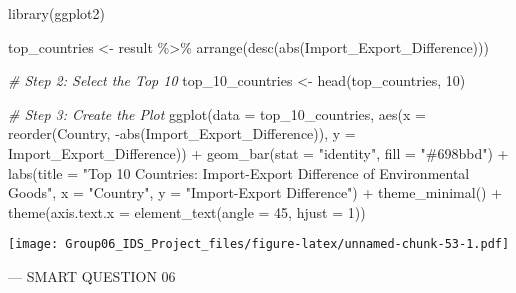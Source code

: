 \documentclass[
]{article}
\newenvironment{Shaded}{\begin{snugshade}}{\end{snugshade}}
\newcommand{\AttributeTok}[1]{\textcolor[rgb]{0.77,0.63,0.00}{#1}}
\newcommand{\CommentTok}[1]{\textcolor[rgb]{0.56,0.35,0.01}{\textit{#1}}}
\newcommand{\DecValTok}[1]{\textcolor[rgb]{0.00,0.00,0.81}{#1}}
\newcommand{\FunctionTok}[1]{\textcolor[rgb]{0.00,0.00,0.00}{#1}}
\newcommand{\NormalTok}[1]{#1}
\newcommand{\OtherTok}[1]{\textcolor[rgb]{0.56,0.35,0.01}{#1}}
\newcommand{\SpecialCharTok}[1]{\textcolor[rgb]{0.00,0.00,0.00}{#1}}
\newcommand{\StringTok}[1]{\textcolor[rgb]{0.31,0.60,0.02}{#1}}
\begin{document}
\begin{Shaded}
\begin{Highlighting}[]
\FunctionTok{library}\NormalTok{(ggplot2)}

\NormalTok{top\_countries }\OtherTok{\textless{}{-}}\NormalTok{ result }\SpecialCharTok{\%\textgreater{}\%}
  \FunctionTok{arrange}\NormalTok{(}\FunctionTok{desc}\NormalTok{(}\FunctionTok{abs}\NormalTok{(Import\_Export\_Difference)))}

\CommentTok{\# Step 2: Select the Top 10}
\NormalTok{top\_10\_countries }\OtherTok{\textless{}{-}} \FunctionTok{head}\NormalTok{(top\_countries, }\DecValTok{10}\NormalTok{)}

\CommentTok{\# Step 3: Create the Plot}
\FunctionTok{ggplot}\NormalTok{(}\AttributeTok{data =}\NormalTok{ top\_10\_countries, }\FunctionTok{aes}\NormalTok{(}\AttributeTok{x =} \FunctionTok{reorder}\NormalTok{(Country, }\SpecialCharTok{{-}}\FunctionTok{abs}\NormalTok{(Import\_Export\_Difference)), }\AttributeTok{y =}\NormalTok{ Import\_Export\_Difference)) }\SpecialCharTok{+}
  \FunctionTok{geom\_bar}\NormalTok{(}\AttributeTok{stat =} \StringTok{"identity"}\NormalTok{, }\AttributeTok{fill =} \StringTok{"\#698bbd"}\NormalTok{) }\SpecialCharTok{+}
  \FunctionTok{labs}\NormalTok{(}\AttributeTok{title =} \StringTok{"Top 10 Countries: Import{-}Export Difference of Environmental Goods"}\NormalTok{,}
       \AttributeTok{x =} \StringTok{"Country"}\NormalTok{,}
       \AttributeTok{y =} \StringTok{"Import{-}Export Difference"}\NormalTok{) }\SpecialCharTok{+}
  \FunctionTok{theme\_minimal}\NormalTok{() }\SpecialCharTok{+}
  \FunctionTok{theme}\NormalTok{(}\AttributeTok{axis.text.x =} \FunctionTok{element\_text}\NormalTok{(}\AttributeTok{angle =} \DecValTok{45}\NormalTok{, }\AttributeTok{hjust =} \DecValTok{1}\NormalTok{))}
\end{Highlighting}
\end{Shaded}

\texttt{[image: Group06\_IDS\_Project\_files/figure-latex/unnamed-chunk-53-1.pdf]}

--- SMART QUESTION 06

\begin{Shaded}
\end{Shaded}
\end{document}
